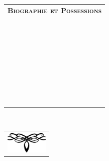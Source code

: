 \documentclass[11pt,twoside,a4paper]{article}
\def\FRdefBiographieEtPossessions{Biographie et Possessions}
\begin{document}
\begin{tabular}[c]{|p{19cm}|}
	\hline
	\textbf{\textsc{\FRdefBiographieEtPossessions}} \\ 
	\dotfill  \\ 
	\dotfill  \\ 
	\dotfill  \\ 
	\dotfill  \\ 
	\dotfill  \\ 
	\dotfill  \\ 
	\dotfill  \\ 
	\dotfill  \\ 
	\dotfill  \\ 
	\dotfill  \\ 
	\dotfill  \\ 
	\dotfill  \\ 
	\dotfill  \\ 
	\dotfill  \\ 
	\dotfill  \\ 
	\dotfill  \\ 
	\dotfill  \\ 
	\dotfill  \\ 
	\dotfill  \\ 
	\dotfill  \\ 
	\dotfill  \\ 
	\dotfill  \\ 
	\dotfill  \\ 
	\dotfill  \\ 
	\dotfill  \\ 
	\dotfill  \\ 
	\dotfill  \\ 
	\dotfill  \\ 
	\dotfill  \\ 
	\dotfill  \\ 
	\dotfill  \\ 
	\dotfill  \\ 
	\dotfill  \\ 
	\dotfill  \\ 
	\hline
\end{tabular}~\\


\begin{center}
	\begin{tabular}[c]{c}
		{\color{white} 
		\includegraphics[width=2cm]{../../../../../imgGraphics/artsDecos/ornement04whiteBG.png} } \\
	\end{tabular}
\end{center}
\end{document}
